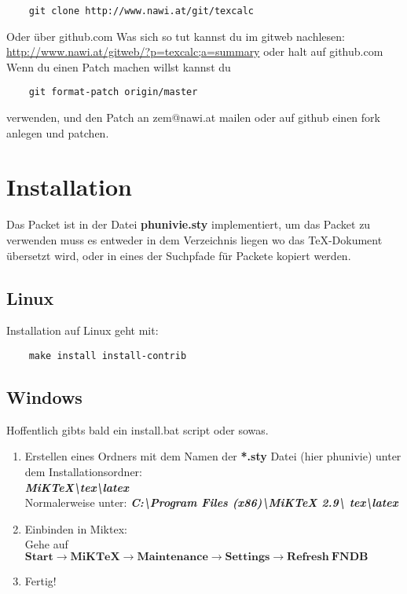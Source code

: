 \documentclass[a4paper]{article}
\begin{document}
\begin{verbatim}
	git clone http://www.nawi.at/git/texcalc
\end{verbatim}

Oder über github.com Was sich so tut kannst du im gitweb nachlesen: 
\url{http://www.nawi.at/gitweb/?p=texcalc;a=summary} oder halt auf github.com\\

Wenn du einen Patch machen willst kannst du 

\begin{verbatim}
	git format-patch origin/master
\end{verbatim}

verwenden, und den Patch an zem@nawi.at mailen oder auf github einen fork 
anlegen und patchen. 


\section{Installation}

Das Packet ist in der Datei {\bf phunivie.sty} implementiert, um das Packet zu 
verwenden muss es entweder in dem Verzeichnis liegen wo das \TeX-Dokument 
übersetzt wird, oder in eines der Suchpfade für Packete kopiert werden.\\



\subsection{Linux}

Installation auf Linux geht mit: 

\begin{verbatim}
	make install install-contrib
\end{verbatim}

\subsection{Windows}

Hoffentlich gibts bald ein install.bat script oder sowas. 

\begin{enumerate}
	\item Erstellen eines Ordners mit dem Namen der \textbf{\textbf{*.sty}} 
		Datei (hier phunivie) unter dem Installationsordner:\\

		\textbf{\emph{MiKTeX\textbackslash tex\textbackslash latex}}\\
		Normalerweise unter: \textbf{\emph{C:\textbackslash Program 
		Files (x86)\textbackslash MiKTeX 2.9\textbackslash 
		tex\textbackslash latex}}

	\item Einbinden in Miktex:\\
			Gehe auf $\boldsymbol{Start \rightarrow MiKTeX \rightarrow 
			Maintenance \rightarrow Settings \rightarrow Refresh~FNDB}$

	\item Fertig!
\end{enumerate}
\end{document}
